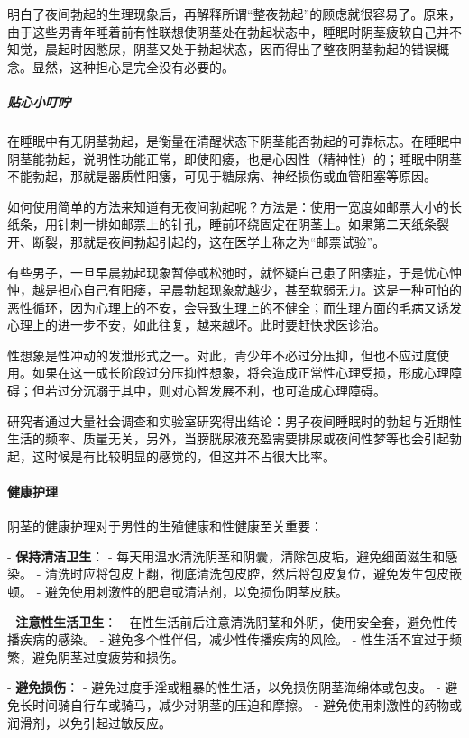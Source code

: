 \begin{enumerate}
明白了夜间勃起的生理现象后，再解释所谓“整夜勃起”的顾虑就很容易了。原来，由于这些男青年睡着前有性联想使阴茎处在勃起状态中，睡眠时阴茎疲软自己并不知觉，晨起时因憋尿，阴茎又处于勃起状态，因而得出了整夜阴茎勃起的错误概念。显然，这种担心是完全没有必要的。

\subparagraph{贴心小叮咛}

在睡眠中有无阴茎勃起，是衡量在清醒状态下阴茎能否勃起的可靠标志。在睡眠中阴茎能勃起，说明性功能正常，即使阳痿，也是心因性（精神性）的；睡眠中阴茎不能勃起，那就是器质性阳痿，可见于糖尿病、神经损伤或血管阻塞等原因。

如何使用简单的方法来知道有无夜间勃起呢？方法是：使用一宽度如邮票大小的长纸条，用针刺一排如邮票上的针孔，睡前环绕固定在阴茎上。如果第二天纸条裂开、断裂，那就是夜间勃起引起的，这在医学上称之为“邮票试验”。

有些男子，一旦早晨勃起现象暂停或松弛时，就怀疑自己患了阳痿症，于是忧心忡忡，越是担心自己有阳痿，早晨勃起现象就越少，甚至软弱无力。这是一种可怕的恶性循环，因为心理上的不安，会导致生理上的不健全；而生理方面的毛病又诱发心理上的进一步不安，如此往复，越来越坏。此时要赶快求医诊治。

性想象是性冲动的发泄形式之一。对此，青少年不必过分压抑，但也不应过度使用。如果在这一成长阶段过分压抑性想象，将会造成正常性心理受损，形成心理障碍；但若过分沉溺于其中，则对心智发展不利，也可造成心理障碍。

研究者通过大量社会调查和实验室研究得出结论：男子夜间睡眠时的勃起与近期性生活的频率、质量无关，另外，当膀胱尿液充盈需要排尿或夜间性梦等也会引起勃起，这时候是有比较明显的感觉的，但这并不占很大比率。

\paragraph{健康护理}

阴茎的健康护理对于男性的生殖健康和性健康至关重要：

- \textbf{保持清洁卫生}：
  - 每天用温水清洗阴茎和阴囊，清除包皮垢，避免细菌滋生和感染。
  - 清洗时应将包皮上翻，彻底清洗包皮腔，然后将包皮复位，避免发生包皮嵌顿。
  - 避免使用刺激性的肥皂或清洁剂，以免损伤阴茎皮肤。

- \textbf{注意性生活卫生}：
  - 在性生活前后注意清洗阴茎和外阴，使用安全套，避免性传播疾病的感染。
  - 避免多个性伴侣，减少性传播疾病的风险。
  - 性生活不宜过于频繁，避免阴茎过度疲劳和损伤。

- \textbf{避免损伤}：
  - 避免过度手淫或粗暴的性生活，以免损伤阴茎海绵体或包皮。
  - 避免长时间骑自行车或骑马，减少对阴茎的压迫和摩擦。
  - 避免使用刺激性的药物或润滑剂，以免引起过敏反应。


\end{enumerate}
